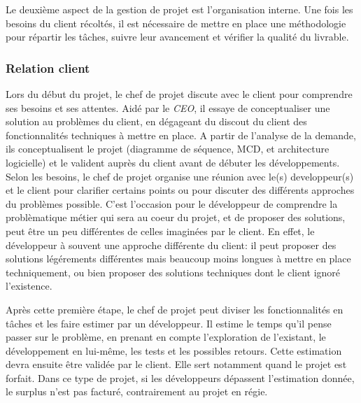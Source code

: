 \documentclass[12pt,a4paper]{article}
\begin{document}
  \bigskip

  Le deuxième aspect de la gestion de projet est l'organisation interne.
  Une fois les besoins du client récoltés, il est nécessaire de mettre en
  place une méthodologie pour répartir les tâches, suivre leur avancement
  et vérifier la qualité du livrable.

  \bigskip

  \subsubsection{Relation client}\label{relation-client}

  \bigskip

  Lors du début du projet, le chef de projet discute avec le client pour
  comprendre ses besoins et ses attentes. Aidé par le \emph{CEO}, il
  essaye de conceptualiser une solution au problèmes du client, en
  dégageant du discout du client des fonctionnalités techniques à mettre
  en place. A partir de l'analyse de la demande, ils conceptualisent le
  projet (diagramme de séquence, MCD, et architecture logicielle) et le
  valident auprès du client avant de débuter les développements. Selon les
  besoins, le chef de projet organise une réunion avec le(s)
  developpeur(s) et le client pour clarifier certains points ou pour
  discuter des différents approches du problèmes possible. C'est
  l'occasion pour le développeur de comprendre la problèmatique métier qui
  sera au coeur du projet, et de proposer des solutions, peut être un peu
  différentes de celles imaginées par le client. En effet, le développeur
  à souvent une approche différente du client: il peut proposer des
  solutions légérements différentes mais beaucoup moins longues à mettre
  en place techniquement, ou bien proposer des solutions techniques dont
  le client ignoré l'existence.

  \bigskip

  Après cette première étape, le chef de projet peut diviser les
  fonctionnalités en tâches et les faire estimer par un développeur. Il
  estime le temps qu'il pense passer sur le problème, en prenant en compte
  l'exploration de l'existant, le développement en lui-même, les tests et
  les possibles retours. Cette estimation devra ensuite être validée par
  le client. Elle sert notamment quand le projet est forfait. Dans ce type
  de projet, si les développeurs dépassent l'estimation donnée, le surplus
  n'est pas facturé, contrairement au projet en régie.

  \bigskip
\end{document}
